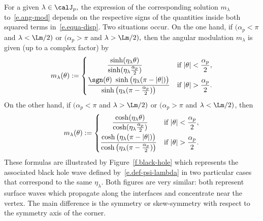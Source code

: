 For a given $\lambda \in \calJ_p,$ the expression of the corresponding solution $m_\lambda$ to~\eqref{e.ang-mod} depends on the respective signs of the quantities inside both squared terms in~\eqref{e.equa-disp}. Two situations occur. On the one hand, if $(\alpha_p < \pi$ and $\lambda < \Lm/2)$ or $(\alpha_p > \pi$ and $\lambda > \Lm/2),$ then the angular modulation $m_\lambda$ is given (up to a complex factor) by
\begin{equation}\label{e.m_lambda-sh}
m_\lambda(\theta) :=
\begin{cases}
\displaystyle
\mkern50mu\frac{\sinh(\eta_\lambda \theta)}{\sinh(\eta_\lambda \frac{\alpha_p}{2})} & \text{if }\displaystyle |\theta| < \frac{\alpha_p}{2}, \\[8pt]
\displaystyle
\frac{\sgn(\theta) \ \sinh\big(\eta_\lambda (\pi - |\theta|)\big)}{\sinh\big(\eta_\lambda (\pi - \frac{\alpha_p}{2})\big)} & \text{if }\displaystyle |\theta| > \frac{\alpha_p}{2}.
\end{cases}
\end{equation}
On the other hand, if $(\alpha_p < \pi$ and $\lambda > \Lm/2)$ or $(\alpha_p > \pi$ and $\lambda < \Lm/2)$, then
\begin{equation}\label{e.m_lambda-ch}
m_\lambda(\theta) := 
\begin{cases}
\displaystyle
\mkern30mu\frac{\cosh(\eta_\lambda \theta)}{\cosh(\eta_\lambda \frac{\alpha_p}{2})} & \text{if }\displaystyle |\theta| < \frac{\alpha_p}{2}, \\[8pt]
\displaystyle
\frac{\cosh\big(\eta_\lambda (\pi - |\theta|)\big)}{\cosh\big(\eta_\lambda (\pi - \frac{\alpha_p}{2})\big)} & \text{if }\displaystyle |\theta| > \frac{\alpha_p}{2}.
\end{cases}
\end{equation}
These formulas are illustrated by Figure~\ref{f.black-hole} which represents the associated black hole wave defined by~\eqref{e.def-psi-lambda} in two particular cases that correspond to the same $\eta_\lambda$. Both figures are very similar: both represent surface waves which propagate along the interfaces and concentrate near the vertex. The main difference is the symmetry or skew-symmetry with respect to the symmetry axis of the corner.

